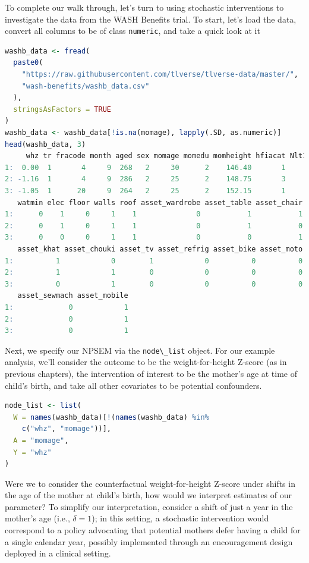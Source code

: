 \documentclass[
  12pt, krantz2,
]{krantz}
\newcommand{\passthrough}[1]{#1}
\theoremstyle{definition}
\theoremstyle{definition}
\theoremstyle{definition}
\newcommand{\1}{\mathbbm{1}}
\begin{document}
To complete our walk through, let's turn to using stochastic interventions to
investigate the data from the WASH Benefits trial. To start, let's load the
data, convert all columns to be of class \passthrough{\lstinline!numeric!}, and take a quick look at it

\begin{lstlisting}[language=R]
washb_data <- fread(
  paste0(
    "https://raw.githubusercontent.com/tlverse/tlverse-data/master/",
    "wash-benefits/washb_data.csv"
  ),
  stringsAsFactors = TRUE
)
washb_data <- washb_data[!is.na(momage), lapply(.SD, as.numeric)]
head(washb_data, 3)
     whz tr fracode month aged sex momage momedu momheight hfiacat Nlt18 Ncomp
1:  0.00  1       4     9  268   2     30      2    146.40       1     3    11
2: -1.16  1       4     9  286   2     25      2    148.75       3     2     4
3: -1.05  1      20     9  264   2     25      2    152.15       1     1    10
   watmin elec floor walls roof asset_wardrobe asset_table asset_chair
1:      0    1     0     1    1              0           1           1
2:      0    1     0     1    1              0           1           0
3:      0    0     0     1    1              0           0           1
   asset_khat asset_chouki asset_tv asset_refrig asset_bike asset_moto
1:          1            0        1            0          0          0
2:          1            1        0            0          0          0
3:          0            1        0            0          0          0
   asset_sewmach asset_mobile
1:             0            1
2:             0            1
3:             0            1
\end{lstlisting}

Next, we specify our NPSEM via the \passthrough{\lstinline!node\_list!} object. For our example analysis,
we'll consider the outcome to be the weight-for-height Z-score (as in previous
chapters), the intervention of interest to be the mother's age at time of
child's birth, and take all other covariates to be potential confounders.

\begin{lstlisting}[language=R]
node_list <- list(
  W = names(washb_data)[!(names(washb_data) %in%
    c("whz", "momage"))],
  A = "momage",
  Y = "whz"
)
\end{lstlisting}

Were we to consider the counterfactual weight-for-height Z-score under shifts in
the age of the mother at child's birth, how would we interpret estimates of our
parameter? To simplify our interpretation, consider a shift of just a year in
the mother's age (i.e., \(\delta = 1\)); in this setting, a stochastic
intervention would correspond to a policy advocating that potential mothers
defer having a child for a single calendar year, possibly implemented through an
encouragement design deployed in a clinical setting.
\end{document}
